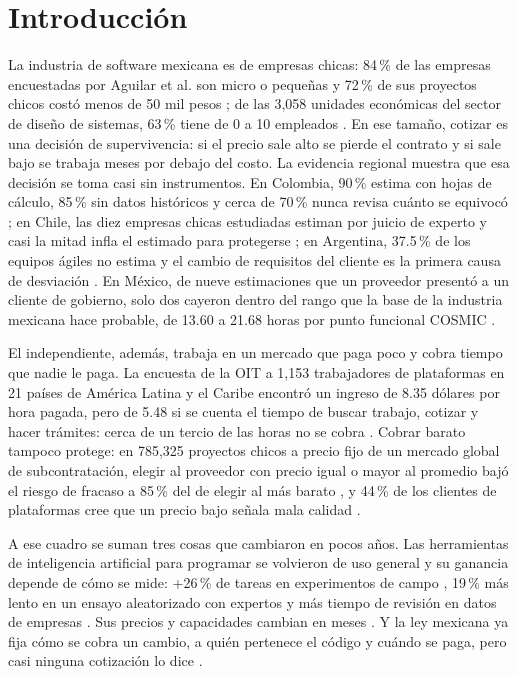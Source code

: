 \documentclass[10pt,twocolumn]{article}
\begin{document}
\section{Introducción}
La industria de software mexicana es de empresas chicas: 84\,\% de las empresas encuestadas por Aguilar et al. son micro o pequeñas y 72\,\% de sus proyectos chicos costó menos de 50 mil pesos \cite{aguilar2014size}; de las 3{,}058 unidades económicas del sector de diseño de sistemas, 63\,\% tiene de 0 a 10 empleados \cite{economia2026servicios}. En ese tamaño, cotizar es una decisión de supervivencia: si el precio sale alto se pierde el contrato y si sale bajo se trabaja meses por debajo del costo. La evidencia regional muestra que esa decisión se toma casi sin instrumentos. En Colombia, 90\,\% estima con hojas de cálculo, 85\,\% sin datos históricos y cerca de 70\,\% nunca revisa cuánto se equivocó \cite{cardozo2022diagnostico}; en Chile, las diez empresas chicas estudiadas estiman por juicio de experto y casi la mitad infla el estimado para protegerse \cite{vera2018understanding}; en Argentina, 37.5\,\% de los equipos ágiles no estima y el cambio de requisitos del cliente es la primera causa de desviación \cite{tortosa2025effort}. En México, de nueve estimaciones que un proveedor presentó a un cliente de gobierno, solo dos cayeron dentro del rango que la base de la industria mexicana hace probable, de 13.60 a 21.68 horas por punto funcional COSMIC \cite{valdessouto2019validation}.

El independiente, además, trabaja en un mercado que paga poco y cobra tiempo que nadie le paga. La encuesta de la OIT a 1{,}153 trabajadores de plataformas en 21 países de América Latina y el Caribe encontró un ingreso de 8.35 dólares por hora pagada, pero de 5.48 si se cuenta el tiempo de buscar trabajo, cotizar y hacer trámites: cerca de un tercio de las horas no se cobra \cite{cravo2025encuesta}. Cobrar barato tampoco protege: en 785{,}325 proyectos chicos a precio fijo de un mercado global de subcontratación, elegir al proveedor con precio igual o mayor al promedio bajó el riesgo de fracaso a 85\,\% del de elegir al más barato \cite{jrgensen2014failure2}, y 44\,\% de los clientes de plataformas cree que un precio bajo señala mala calidad \cite{ahmed2026beliefs}.

A ese cuadro se suman tres cosas que cambiaron en pocos años. Las herramientas de inteligencia artificial para programar se volvieron de uso general y su ganancia depende de cómo se mide: +26\,\% de tareas en experimentos de campo \cite{cui2025}, 19\,\% más lento en un ensayo aleatorizado con expertos \cite{becker2025} y más tiempo de revisión en datos de empresas \cite{michels2026vibe}. Sus precios y capacidades cambian en meses \cite{committee2026ai,anthropic2026introducing}. Y la ley mexicana ya fija cómo se cobra un cambio, a quién pertenece el código y cuándo se paga, pero casi ninguna cotización lo dice \cite{union2025codigo,union2026ley,union2025codigo2}.
\end{document}

